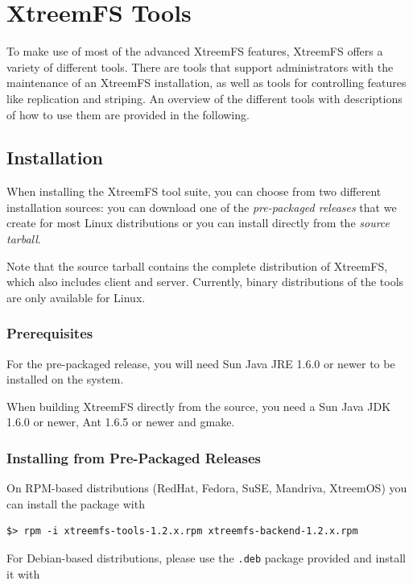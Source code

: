 \documentclass[a4paper,10pt]{book}
\begin{document}
\chapter{XtreemFS Tools}

To make use of most of the advanced XtreemFS features, XtreemFS offers a variety of different tools. There are tools that support administrators with the maintenance of an XtreemFS installation, as well as tools for controlling features like replication and striping. An overview of the different tools with descriptions of how to use them are provided in the following.

\section{Installation}

When installing the XtreemFS tool suite, you can choose from two different installation sources: you can download one of the \emph{pre-packaged releases} that we create for most Linux distributions or you can install directly from the \emph{source tarball}.

Note that the source tarball contains the complete distribution of XtreemFS, which also includes client and server. Currently, binary distributions of the tools are only available for Linux.

\subsection{Prerequisites}

For the pre-packaged release, you will need Sun Java JRE 1.6.0 or newer to be installed on the system.

When building XtreemFS directly from the source, you need a Sun Java JDK 1.6.0 or newer, Ant 1.6.5 or newer and gmake.

\subsection{Installing from Pre-Packaged Releases}

On RPM-based distributions (RedHat, Fedora, SuSE, Mandriva, XtreemOS) you can install the package with

\begin{verbatim}
$> rpm -i xtreemfs-tools-1.2.x.rpm xtreemfs-backend-1.2.x.rpm
\end{verbatim}


For Debian-based distributions, please use the \texttt{.deb} package provided and install it with
\end{document}

